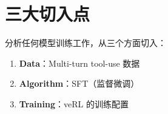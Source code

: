 \section{三大切入点}
分析任何模型训练工作，从三个方面切入：
\begin{enumerate}
  \item \textbf{Data}：Multi-turn tool-use 数据
  \item \textbf{Algorithm}：SFT（监督微调）
  \item \textbf{Training}：veRL 的训练配置
\end{enumerate}

